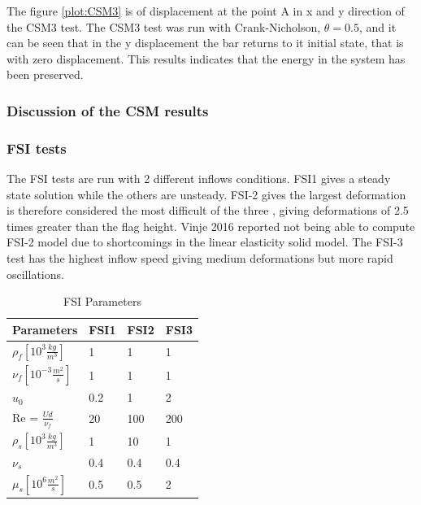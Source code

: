 The figure \ref{plot:CSM3} is of displacement at the point A in x and y direction of the CSM3 test. The CSM3 test was run with Crank-Nicholson, $\theta = 0.5$, and it can be seen that in the y displacement the bar returns to it initial state, that is with zero displacement. This results indicates that the energy in the system has been preserved.

\subsubsection*{Discussion of the CSM results}


\subsubsection*{FSI tests}
The FSI tests are run with 2 different inflows conditions. FSI1 gives a steady state solution while the others are unsteady. FSI-2 gives the largest deformation is therefore considered the most difficult of the three \cite{Richter2013}, giving deformations of 2.5 times greater than the flag height. Vinje 2016 \cite{Vinje2016} reported not being able to compute FSI-2 model due to shortcomings in the linear elasticity solid model. The FSI-3 test has the highest inflow speed giving medium deformations but more rapid oscillations.


\begin{table}[h!]
\centering
\caption{FSI Parameters}
\label{my-label}
\begin{tabular}{|l|l|l|l|}
\hline
Parameters & FSI1 & FSI2 & FSI3 \\ \hline
$\rho_f[10^3 \frac{kg}{m^3}]$ & 1 & 1 & 1 \\ \hline
$\nu_f [10^{-3} \frac{m^2}{s}]$ & 1 & 1 & 1 \\ \hline
$u_0$ & 0.2 & 1 & 2 \\ \hline
Re = $\frac{U d}{\nu_f}$ & 20 & 100 & 200 \\ \hline
$\rho_s[10^3 \frac{kg}{m^3}]$ & 1 & 10 & 1 \\ \hline
$\nu_s$ & 0.4 & 0.4 & 0.4 \\ \hline
$\mu_s[10^6 \frac{m^2}{s}]$ & 0.5 & 0.5 & 2 \\ \hline
\end{tabular}
\end{table}

